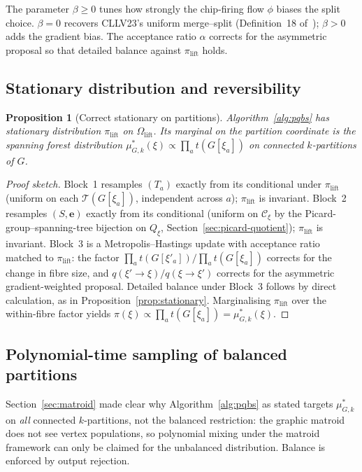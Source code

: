 \documentclass[11pt]{article}
\newtheorem{proposition}{Proposition}[section]
\begin{document}
\noindent The parameter $\beta \geq 0$ tunes how strongly the chip-firing
flow $\phi$ biases the split choice. $\beta = 0$ recovers CLLV23's
uniform merge--split (Definition~18 of~\cite{charikar2023complexity});
$\beta > 0$ adds the gradient bias. The acceptance ratio $\alpha$
corrects for the asymmetric proposal so that detailed balance against
$\pi_{\mathrm{lift}}$ holds.

\subsection{Stationary distribution and reversibility}

\begin{proposition}[Correct stationary on partitions]\label{prop:pqbs-stationary}
Algorithm~\ref{alg:pqbs} has stationary distribution $\pi_{\mathrm{lift}}$ on
$\Omega_{\mathrm{lift}}$. Its marginal on the partition coordinate is the
spanning forest distribution $\mu^*_{G,k}(\xi) \propto \prod_a t(G[\xi_a])$
on connected $k$-partitions of $G$.
\end{proposition}

\begin{proof}[Proof sketch]
Block~1 resamples $(T_a)$ exactly from its conditional under
$\pi_{\mathrm{lift}}$ (uniform on each $\mathcal{T}(G[\xi_a])$,
independent across $a$); $\pi_{\mathrm{lift}}$ is invariant. Block~2
resamples $(S, \mathbf{e})$ exactly from its conditional (uniform on
$\mathcal{C}_\xi$ by the Picard-group--spanning-tree bijection on $Q_\xi$,
Section~\ref{sec:picard-quotient}); $\pi_{\mathrm{lift}}$ is invariant.
Block~3 is a Metropolis--Hastings update with acceptance ratio
matched to $\pi_{\mathrm{lift}}$: the factor
$\prod_a t(G[\xi'_a]) / \prod_a t(G[\xi_a])$ corrects for the change in
fibre size, and $q(\xi' \to \xi)/q(\xi \to \xi')$ corrects for the
asymmetric gradient-weighted proposal. Detailed balance under Block~3
follows by direct calculation, as in Proposition~\ref{prop:stationary}.
Marginalising $\pi_{\mathrm{lift}}$ over the within-fibre factor yields
$\pi(\xi) \propto \prod_a t(G[\xi_a]) = \mu^*_{G,k}(\xi)$.
\end{proof}

\subsection{Polynomial-time sampling of balanced partitions}\label{sec:poly-time}

Section~\ref{sec:matroid} made clear why Algorithm~\ref{alg:pqbs} as
stated targets $\mu^*_{G,k}$ on \emph{all} connected $k$-partitions, not
the balanced restriction: the graphic matroid does not see vertex
populations, so polynomial mixing under the matroid framework can only
be claimed for the unbalanced distribution. Balance is enforced by
output rejection.
\end{document}
